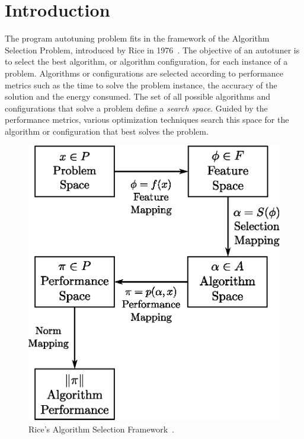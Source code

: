 \documentclass[a4paper, 12pt]{article}
\begin{document}
\section{Introduction} \label{sec:intro}

The program autotuning problem fits in the framework of the Algorithm Selection
Problem, introduced by Rice in 1976~\cite{rice1976algorithm}. The objective of
an autotuner is to select the best algorithm, or algorithm configuration, for
each instance of a problem.  Algorithms or configurations are selected
according to performance metrics such as the time to solve the problem
instance, the accuracy of the solution and the energy consumed.  The set of all
possible algorithms and configurations that solve a problem define a
\emph{search space}. Guided by the performance metrics, various optimization
techniques search this space for the algorithm or configuration that best
solves the problem.

\begin{figure}[htpb]
    \centering
    \includegraphics[scale=.5]{algorithm-selection}
    \caption{Rice's Algorithm Selection Framework~\cite{rice1976algorithm}.}
    \label{fig:asf}
\end{figure}
\end{document}
